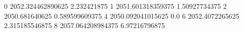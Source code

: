 0 2052.324462890625 2.232421875
1 2051.601318359375 1.50927734375
2 2050.681640625 0.589599609375
4 2050.092041015625 0.0
6 2052.4072265625 2.315185546875
8 2057.064208984375 6.97216796875
